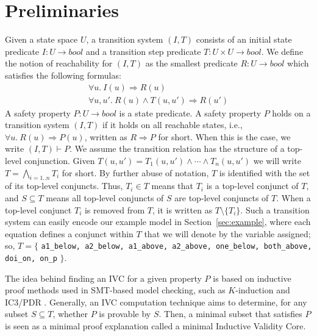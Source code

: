 \section{Preliminaries}
\label{sec:background}

\newcommand{\ivc}{\textit{IVC}}
\newcommand{\mivc}{\textit{MIVC}}
\newcommand{\bool}[0]{\mathit{bool}}
\newcommand{\reach}[0]{\mathit{R}}
\newcommand{\ite}[3]{\mathit{if}\ {#1}\ \mathit{then}\ {#2}\ \mathit{else}\ {#3}}

Given a state space $U$, a transition system $(I,T)$ consists of an
initial state predicate $I : U \to \bool$ and a transition step
predicate $T : U \times U \to \bool$.
We define the notion of
reachability for $(I, T)$ as the smallest predicate $\reach : U \to
\bool$ which satisfies the following formulas:
\begin{gather*}
  \forall u.~ I(u) \Rightarrow \reach(u) \\
  \forall u, u'.~ \reach(u) \land T(u, u') \Rightarrow \reach(u')
\end{gather*}
A safety property $P : U \to \bool$ is a state predicate. A safety
property $P$ holds on a transition system $(I, T)$ if it holds on all
reachable states, i.e., $\forall u.~ \reach(u) \Rightarrow P(u)$,
written as $\reach \Rightarrow P$ for short. When this is the case, we
write $(I, T)\vdash P$. We assume the transition relation has the structure of a top-level conjunction.  Given $T(u, u') = T_1(u, u') \land \cdots \land T_n(u, u')$ we will write $T = \bigwedge_{i=1..n}T_i$ for short.
By further abuse of notation,
$T$ is identified with the set of its top-level conjuncts. Thus, $T_i \in
T$ means that $T_i$ is a top-level conjunct of $T$, and $S
\subseteq T$ means all top-level conjuncts of $S$ are top-level
conjuncts of $T$. When a top-level conjunct $T_i$ is removed from $T$, it is written as $T \setminus \{T_i\}$. Such a transition system can easily encode our example model in Section~\ref{sec:example}, where each equation defines a conjunct within $T$ that we will denote by the variable assigned; so, $T = \{$ {\small \texttt{a1\_below, a2\_below, a1\_above, a2\_above, one\_below, both\_above, doi\_on, on\_p}} $\}$.

The idea behind finding an IVC for a given property $P$ \cite{Ghass16} is based on inductive proof methods used in SMT-based model checking, such as $K$-induction and IC3/PDR \cite{NFM2012:KaGaTiWh, amla2005analysis, Een2011:PDR}. Generally, an IVC computation technique aims to determine, for any subset $S \subseteq T$, whether $P$ is provable by $S$. Then, a minimal subset that satisfies $P$ is seen as a minimal proof explanation called a minimal Inductive Validity Core.

